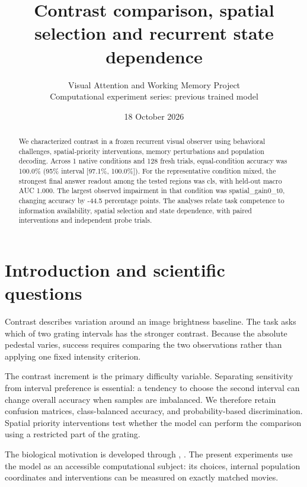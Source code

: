 \documentclass[11pt]{article}
\begin{document}
\title{\color{ink}Contrast comparison, spatial selection and recurrent state dependence}
\author{Visual Attention and Working Memory Project\\Computational experiment series: previous trained model}\date{18 October 2026}\maketitle
\begin{abstract}
We characterized contrast in a frozen recurrent visual observer using behavioral challenges, spatial-priority interventions, memory perturbations and population decoding. Across 1 native conditions and 128 fresh trials, equal-condition accuracy was 100.0\% (95\% interval [97.1\%, 100.0\%]). For the representative condition mixed, the strongest final answer readout among the tested regions was cls, with held-out macro AUC 1.000. The largest observed impairment in that condition was spatial\_\allowbreak{}gain0\_\allowbreak{}t0, changing accuracy by -44.5 percentage points. The analyses relate task competence to information availability, spatial selection and state dependence, with paired interventions and independent probe trials.
\end{abstract}
\section{Introduction and scientific questions}
Contrast describes variation around an image brightness baseline. The task asks which of two grating intervals has the stronger contrast. Because the absolute pedestal varies, success requires comparing the two observations rather than applying one fixed intensity criterion.

The contrast increment is the primary difficulty variable. Separating sensitivity from interval preference is essential: a tendency to choose the second interval can change overall accuracy when samples are imbalanced. We therefore retain confusion matrices, class-balanced accuracy, and probability-based discrimination. Spatial priority interventions test whether the model can perform the comparison using a restricted part of the grating.

The biological motivation is developed through \cite{contrast}, \cite{normalization}. The present experiments use the model as an accessible computational subject: its choices, internal population coordinates and interventions can be measured on exactly matched movies.
\end{document}
